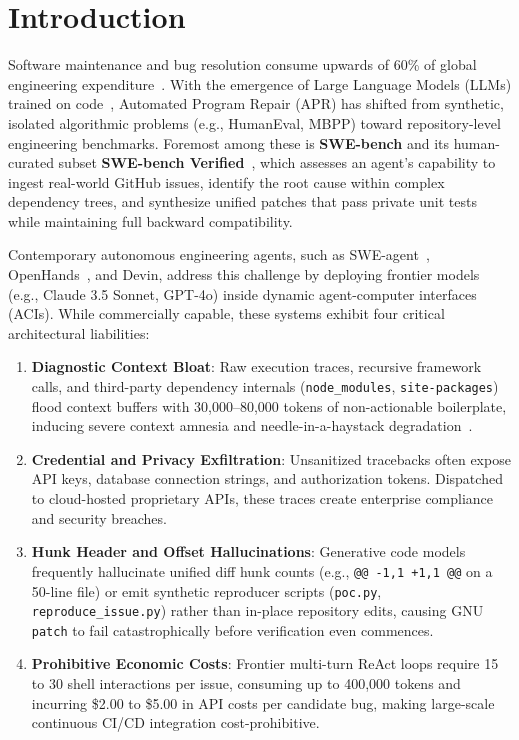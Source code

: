 \documentclass[10pt,twocolumn,letterpaper]{article}
\begin{document}
\section{Introduction}
Software maintenance and bug resolution consume upwards of 60\% of global engineering expenditure~\cite{goues2019automated}. With the emergence of Large Language Models (LLMs) trained on code~\cite{roziere2023code, hui2024qwen25coder}, Automated Program Repair (APR) has shifted from synthetic, isolated algorithmic problems (e.g., HumanEval, MBPP) toward repository-level engineering benchmarks. Foremost among these is \textbf{SWE-bench} and its human-curated subset \textbf{SWE-bench Verified}~\cite{jimenez2024swebench}, which assesses an agent's capability to ingest real-world GitHub issues, identify the root cause within complex dependency trees, and synthesize unified patches that pass private unit tests while maintaining full backward compatibility.

Contemporary autonomous engineering agents, such as SWE-agent~\cite{yang2024sweagent}, OpenHands~\cite{wang2024openhands}, and Devin, address this challenge by deploying frontier models (e.g., Claude 3.5 Sonnet, GPT-4o) inside dynamic agent-computer interfaces (ACIs). While commercially capable, these systems exhibit four critical architectural liabilities:
\begin{enumerate}
    \item \textbf{Diagnostic Context Bloat}: Raw execution traces, recursive framework calls, and third-party dependency internals (\texttt{node\_modules}, \texttt{site-packages}) flood context buffers with 30,000--80,000 tokens of non-actionable boilerplate, inducing severe context amnesia and needle-in-a-haystack degradation~\cite{liu2024lost}.
    \item \textbf{Credential and Privacy Exfiltration}: Unsanitized tracebacks often expose API keys, database connection strings, and authorization tokens. Dispatched to cloud-hosted proprietary APIs, these traces create enterprise compliance and security breaches.
    \item \textbf{Hunk Header and Offset Hallucinations}: Generative code models frequently hallucinate unified diff hunk counts (e.g., \texttt{@@ -1,1 +1,1 @@} on a 50-line file) or emit synthetic reproducer scripts (\texttt{poc.py}, \texttt{reproduce\_issue.py}) rather than in-place repository edits, causing GNU \texttt{patch} to fail catastrophically before verification even commences.
    \item \textbf{Prohibitive Economic Costs}: Frontier multi-turn ReAct loops require 15 to 30 shell interactions per issue, consuming up to 400,000 tokens and incurring \$2.00 to \$5.00 in API costs per candidate bug, making large-scale continuous CI/CD integration cost-prohibitive.
\end{enumerate}
\end{document}
